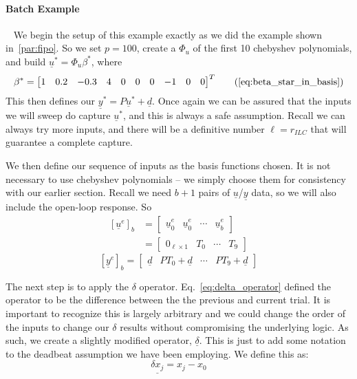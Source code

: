 \FloatBarrier\paragraph{Batch Example}
~\label{par:batch_ex}
We begin the setup of this example exactly as we did the example shown in~\ref{par:fipo}. So we set $p=100$, create a $\Phi_u$ of the first 10 chebyshev polynomials, and build $\underline{u}^\ast = \Phi_u \beta^\ast$, where
\begin{equation}
    \beta^\ast = {\begin{bmatrix}1 & 0.2 & -0.3 & 4 & 0 & 0 & 0 & -1 & 0 & 0\end{bmatrix}}^T
    \tag{\ref{eq:beta_star_in_basis}}
\end{equation}
This then defines our $\underline{y}^\ast = P\underline{u}^\ast + \underline{d}$. Once again we can be assured that the inputs we will sweep do capture $\underline{u}^\ast$, and this is always a safe assumption. Recall we can always try more inputs, and there will be a definitive number $\ell = r_{ILC}$ that will guarantee a complete capture.

We then define our sequence of inputs as the basis functions chosen. It is not necessary to use chebyshev polynomials -- we simply choose them for consistency with our earlier section. Recall we need $b+1$ pairs of $\underline{u}$/$\underline{y}$ data, so we will also include the open-loop response. So
\begin{equation}
    \begin{split}
        {\left[\underline{u}^e\right]}_b  &= 
        \begin{bmatrix}
            \underline{u}_0^e & \underline{u}_0^e & \cdots & \underline{u}_b^e
        \end{bmatrix}
        \\ &= 
        \begin{bmatrix}
            0_{\ell \times 1} & T_0 & \cdots & T_9
        \end{bmatrix}
    \end{split}
\end{equation}
\begin{equation}
    {\left[\underline{y}^e\right]}_b  = 
    \begin{bmatrix}
        \underline{d} & PT_0+\underline{d} & \cdots & PT_9+\underline{d}
    \end{bmatrix}
\end{equation}

The next step is to apply the $\delta$ operator. Eq.~\ref{eq:delta_operator} defined the operator to be the difference between the the previous and current trial. It is important to recognize this is largely arbitrary and we could change the order of the inputs to change our $\delta$ results without compromising the underlying logic. As such, we create a slightly modified operator, $\underline{\delta}$. This is just to add some notation to the deadbeat assumption we have been employing. We define this as:
\begin{equation}
    \underline{\delta x_j} = x_j - x_0
\end{equation}


